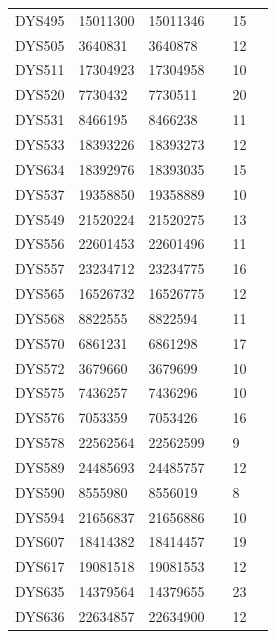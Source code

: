 \begin{tabularx}{\linewidth}{l l l l l l }
DYS495      & 15011300 & 15011346 &                        & 15 \\
DYS505      & 3640831  & 3640878  &                        & 12 \\
DYS511      & 17304923 & 17304958 &                        & 10 \\
DYS520      & 7730432  & 7730511  &                        & 20 \\
DYS531      & 8466195  & 8466238  &                        & 11 \\
DYS533      & 18393226 & 18393273 &                        & 12 \\
DYS634      & 18392976 & 18393035 &                        & 15 \\
DYS537      & 19358850 & 19358889 &                        & 10 \\
DYS549      & 21520224 & 21520275 &                        & 13 \\
DYS556      & 22601453 & 22601496 &                        & 11 \\
DYS557      & 23234712 & 23234775 &                        & 16 \\
DYS565      & 16526732 & 16526775 &                        & 12 \\
DYS568      & 8822555  & 8822594  &                        & 11 \\
DYS570      & 6861231  & 6861298  &                        & 17 \\
DYS572      & 3679660  & 3679699  &                        & 10 \\
DYS575      & 7436257  & 7436296  &                        & 10 \\
DYS576      & 7053359  & 7053426  &                        & 16 \\
DYS578      & 22562564 & 22562599 &                        & 9  \\
DYS589      & 24485693 & 24485757 &                        & 12 \\
DYS590      & 8555980  & 8556019  &                        & 8  \\
DYS594      & 21656837 & 21656886 &                        & 10 \\
DYS607      & 18414382 & 18414457 &                        & 19 \\
DYS617      & 19081518 & 19081553 &                        & 12 \\
DYS635      & 14379564 & 14379655 &                        & 23 \\
DYS636      & 22634857 & 22634900 &                        & 12 \\

\end{tabularx}
